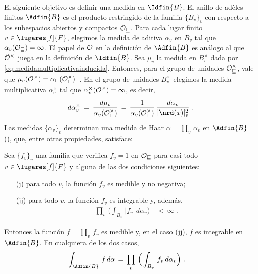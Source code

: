 El siguiente objetivo es definir una medida en $\Idfin{B}$.
El anillo de ad\`{e}les finitos $\Adfin{B}$ es el producto restringido de la
familia $\{B_{v}\}_{v}$ con respecto a los subespacios abiertos y
compactos $\cal{O}_{v}$. Para cada lugar finito $v\in\lugares[f]{F}$,
elegimos la medida de aditiva $\alpha_{v}$ en $B_{v}$ tal que
$\alpha_{v}(\cal{O}_{v})=1$. El papel de $\cal{O}$ en la definici\'{o}n de
$\Adfin{B}$ es an\'{a}logo al que $\cal{O}^{\times}$ juega en la
definici\'{o}n de $\Idfin{B}$. Sea $\mu_{v}$ la medida en $B_{v}^{\times}$
dada por \eqref{eq:medidamultiplicativainducida}. Entonces, para el grupo de
unidades $\cal{O}_{v}^{\times}$, vale que
\begin{math}
	\mu_{v}(\cal{O}_{v}^{\times})=\alpha_{v}(\cal{O}_{v}^{\times})
\end{math}~.
En el grupo de unidades $B_{v}^{\times}$ elegimos la medida multiplicativa
$\alpha_{v}^{\times}$ tal que $\alpha_{v}^{\times}(\cal{O}_{v}^{\times})=1$,
es decir,
\begin{equation}
	\label{eq:medidamultiplicativainducidacorrectamente}
	d\alpha_{v}^{\times} \,=\,
		\frac{d\mu_{v}}{\alpha_{v}(\cal{O}_{v}^{\times})}
		\,=\,\frac{1}{\alpha_{v}(\cal{O}_{v}^{\times})}\,
			\frac{d\alpha_{v}}{|\nrd(x)|_{v}^{2}}
	\text{ .}
\end{equation}
%
Las medidas $\{\alpha_{v}\}_{v}$ determinan una medida de Haar
$\alpha=\prod_{v}\,\alpha_{v}$ en $\Adfin{B}$
(\cite[Ch.~XV]{CasselsFrohlichANT}), que, entre otras propiedades, satisface:
\begin{propoMedidaEnAdelesFinitos}\label{thm:medidaenadelesfinitos}
	Sea $\{f_{v}\}_{v}$ una familia que verifica $f_{v}=1$ en
	$\cal{O}_{v}$ para casi todo $v\in\lugares[f]{F}$ y alguna de las dos
	condiciones siguientes:
	\begin{itemize}
		\item[(j)] para todo $v$, la funci\'{o}n $f_{v}$ es medible y
			no negativa;
		\item[(jj)] para todo $v$, la funci\'{o}n $f_{v}$ es integrable
			y, adem\'{a}s,
			\begin{align*}
				\prod_{v}\,\Big(\int_{B_{v}}\,
					|f_{v}|\,d\alpha_{v}\Big) & \,<\,\infty
				\text{ .}
			\end{align*}
	\end{itemize}
	Entonces la funci\'{o}n $f=\prod_{v}\,f_{v}$ es medible y, en el caso
	(jj), $f$ es integrable en $\Adfin{B}$. En cualquiera de los dos casos,
	\begin{align*}
		\int_{\Adfin{B}}\,f\,d\alpha & \,=\,
			\prod_{v}\,\Big(\int_{B_{v}}\,f_{v}\,d\alpha_{v}\Big)
		\text{ .}
	\end{align*}
\end{propoMedidaEnAdelesFinitos}

